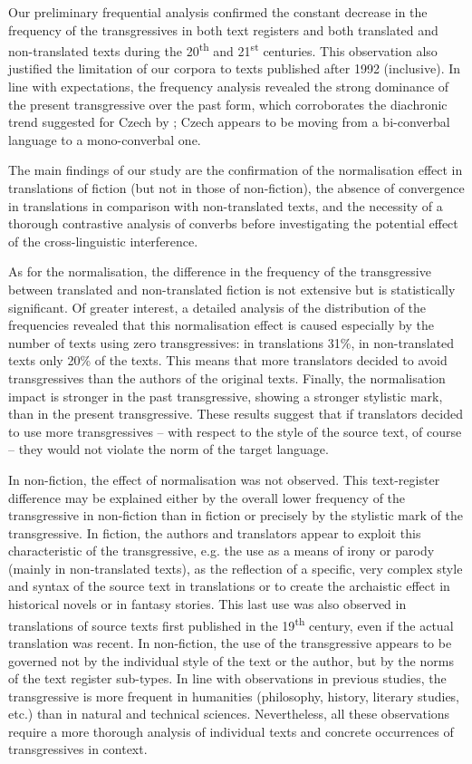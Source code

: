 \documentclass[output=paper,russian]{langsci/langscibook}
\begin{document}
Our preliminary frequential analysis confirmed the constant decrease in the frequency of the transgressives in both text registers and both translated and non-translated texts during the 20\textsuperscript{th} and 21\textsuperscript{st} centuries. This observation also justified the limitation of our corpora to texts published after 1992 (inclusive). In line with expectations, the frequency analysis revealed the strong dominance of the present transgressive over the past form, which corroborates the diachronic trend suggested for Czech by \textcite{nedjalkov95}; Czech appears to be moving from a bi-converbal language to a mono-converbal one. 

The main findings of our study are the confirmation of the normalisation effect in translations of fiction (but not in those of non-fiction), the absence of convergence in translations in comparison with non-translated texts, and the necessity of a thorough contrastive analysis of converbs before investigating the potential effect of the cross-linguistic interference.

As for the normalisation, the difference in the frequency of the transgressive between translated and non-translated fiction is not extensive but is statistically significant. Of greater interest, a detailed analysis of the distribution of the frequencies revealed that this normalisation effect is caused especially by the number of texts using zero transgressives: in translations 31\%, in non-translated texts only 20\% of the texts. This means that more translators decided to avoid transgressives than the authors of the original texts. Finally, the normalisation impact is stronger in the past transgressive, showing a stronger stylistic mark, than in the present transgressive. These results suggest that if translators decided to use more transgressives -- with respect to the style of the source text, of course -- they would not violate the norm of the target language.

In non-fiction, the effect of normalisation was not observed. This text-register difference may be explained either by the overall lower frequency of the transgressive in non-fiction than in fiction or precisely by the stylistic mark of the transgressive. In fiction, the authors and translators appear to exploit this characteristic of the transgressive, e.g. the use as a means of irony or parody (mainly in non-translated texts), as the reflection of a specific, very complex style and syntax of the source text in translations or to create the archaistic effect in historical novels or in fantasy stories. This last use was also observed in translations of source texts first published in the 19\textsuperscript{th} century, even if the actual translation was recent. In non-fiction, the use of the transgressive appears to be governed not by the individual style of the text or the author, but by the norms of the text register sub-types. In line with observations in previous studies, the transgressive is more frequent in humanities (philosophy, history, literary studies, etc.) than in natural and technical sciences. Nevertheless, all these observations require a more thorough analysis of individual texts and concrete occurrences of transgressives in context.
\end{document}
